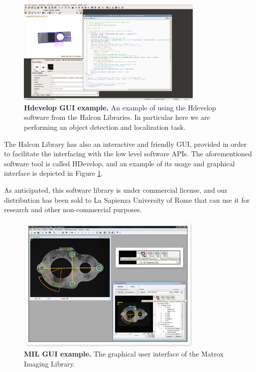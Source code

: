 \begin{figure}
    \centering
    \includegraphics[width=0.8\textwidth]{figures/1_perception_and_sensing_in_robotics/hdevelop_gui_example}
    \caption{\textbf{Hdevelop GUI example.} An example of using the Hdevelop software from the Halcon Libraries. In particular here we are performing an object detection and localization task.} 
    \label{fig:hdevelop_example}
\end{figure}

The Halcon Library has also an interactive and friendly GUI, provided in order to facilitate the interfacing with the low level software APIs. The aforementioned software tool is called HDevelop, and an example of its usage and graphical interface is depicted in Figure \ref{fig:hdevelop_example}.

As anticipated, this software library is under commercial license, and our distribution has been sold to La Sapienza University of Rome that can use it for research and other non-commercial purposes. 

\begin{figure}
    \centering
    \includegraphics[width=0.8\textwidth]{figures/1_perception_and_sensing_in_robotics/mil_gui_example}
    \caption{\textbf{MIL GUI example.} The graphical user interface of the Matrox Imaging Library.} 
    \label{fig:mil_example}
\end{figure}

